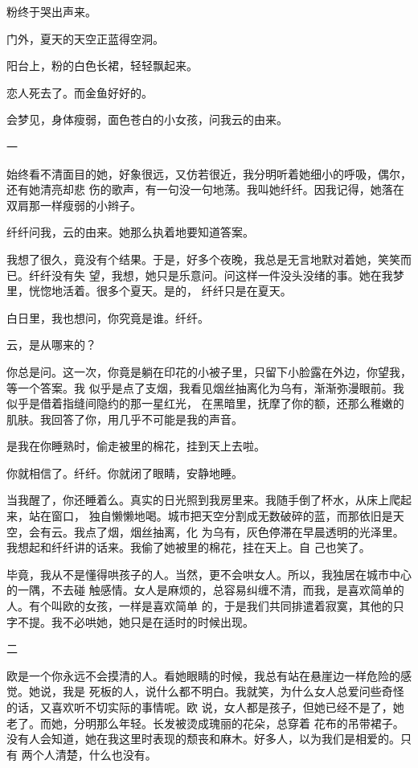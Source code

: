\documentclass[12pt,a4paper]{article}
\newcommand{\subpart}[1]{
	\begingroup \par
	\vspace{1ex} \centering #1
	\par \endgroup \nopagebreak[4]
}
\begin{document}
		粉终于哭出声来。

		门外，夏天的天空正蓝得空洞。

		阳台上，粉的白色长裙，轻轻飘起来。

		恋人死去了。而金鱼好好的。

	\endwriting



		会梦见，身体瘦弱，面色苍白的小女孩，问我云的由来。

		\subpart{一}

		始终看不清面目的她，好象很远，又仿若很近，我分明听着她细小的呼吸，偶尔，还有她清亮却悲
	伤的歌声，有一句没一句地荡。我叫她纤纤。因我记得，她落在双肩那一样瘦弱的小辫子。

		纤纤问我，云的由来。她那么执着地要知道答案。

		我想了很久，竟没有个结果。于是，好多个夜晚，我总是无言地默对着她，笑笑而已。纤纤没有失
	望，我想，她只是乐意问。问这样一件没头没绪的事。她在我梦里，恍惚地活着。很多个夏天。是的，
	纤纤只是在夏天。

		白日里，我也想问，你究竟是谁。纤纤。

		云，是从哪来的？

		你总是问。这一次，你竟是躺在印花的小被子里，只留下小脸露在外边，你望我，等一个答案。我
	似乎是点了支烟，我看见烟丝抽离化为乌有，渐渐弥漫眼前。我似乎是借着指缝间隐约的那一星红光，
	在黑暗里，抚摩了你的额，还那么稚嫩的肌肤。我回答了你，用几乎不可能是我的声音。

		是我在你睡熟时，偷走被里的棉花，挂到天上去啦。

		你就相信了。纤纤。你就闭了眼睛，安静地睡。

		当我醒了，你还睡着么。真实的日光照到我房里来。我随手倒了杯水，从床上爬起来，站在窗口，
	独自懒懒地喝。城市把天空分割成无数破碎的蓝，而那依旧是天空，会有云。我点了烟，烟丝抽离，化
	为乌有，灰色停滞在早晨透明的光泽里。我想起和纤纤讲的话来。我偷了她被里的棉花，挂在天上。自
	己也笑了。

		毕竟，我从不是懂得哄孩子的人。当然，更不会哄女人。所以，我独居在城市中心的一隅，不去碰
	触感情。女人是麻烦的，总容易纠缠不清，而我，是喜欢简单的人。有个叫欧的女孩，一样是喜欢简单
	的，于是我们共同排遣着寂寞，其他的只字不提。我不必哄她，她只是在适时的时候出现。

		\subpart{二}

		欧是一个你永远不会摸清的人。看她眼睛的时候，我总有站在悬崖边一样危险的感觉。她说，我是
	死板的人，说什么都不明白。我就笑，为什么女人总爱问些奇怪的话，又喜欢听不切实际的事情呢。欧
	说，女人都是孩子，但她已经不是了，她老了。而她，分明那么年轻。长发被烫成瑰丽的花朵，总穿着
	花布的吊带裙子。没有人会知道，她在我这里时表现的颓丧和麻木。好多人，以为我们是相爱的。只有
	两个人清楚，什么也没有。
\end{document}
